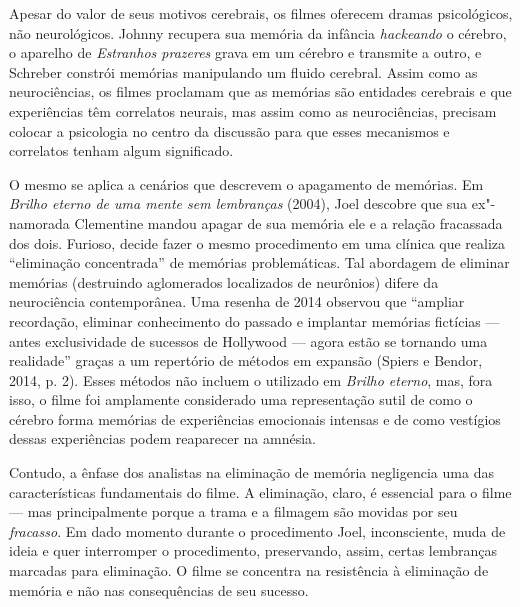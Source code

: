 Apesar do valor de seus motivos cerebrais, os filmes oferecem dramas
psicológicos, não neurológicos. Johnny recupera sua memória da infância
\emph{hackeando} o cérebro, o aparelho de \emph{Estranhos prazeres}
grava em um cérebro e transmite a outro, e Schreber constrói memórias
manipulando um fluido cerebral. Assim como as neurociências, os filmes
proclamam que as memórias são entidades cerebrais e que experiências têm
correlatos neurais, mas assim como as neurociências, precisam colocar a
psicologia no centro da discussão para que esses mecanismos e correlatos
tenham algum significado.

O mesmo se aplica a cenários que descrevem o apagamento de memórias. Em
\emph{Brilho eterno de uma mente sem lembranças} (2004), Joel descobre
que sua ex"-namorada Clementine mandou apagar de sua memória ele e a
relação fracassada dos dois. Furioso, decide fazer o mesmo procedimento
em uma clínica que realiza ``eliminação concentrada'' de memórias
problemáticas. Tal abordagem de eliminar memórias (destruindo
aglomerados localizados de neurônios) difere da neurociência
contemporânea. Uma resenha de 2014 observou que ``ampliar recordação,
eliminar conhecimento do passado e implantar memórias fictícias ---
antes exclusividade de sucessos de Hollywood --- agora estão se tornando
uma realidade'' graças a um repertório de métodos em expansão (Spiers e
Bendor, 2014, p. 2). Esses métodos não incluem o utilizado em
\emph{Brilho eterno}, mas, fora isso, o filme foi amplamente considerado
uma representação sutil de como o cérebro forma memórias de experiências
emocionais intensas e de como vestígios dessas experiências podem
reaparecer na amnésia.

Contudo, a ênfase dos analistas na eliminação de memória negligencia uma
das características fundamentais do filme. A eliminação, claro, é
essencial para o filme --- mas principalmente porque a trama e a
filmagem são movidas por seu \emph{fracasso}. Em dado momento durante o
procedimento Joel, inconsciente, muda de ideia e quer interromper o
procedimento, preservando, assim, certas lembranças marcadas para
eliminação. O filme se concentra na resistência à eliminação de memória
e não nas consequências de seu sucesso.

